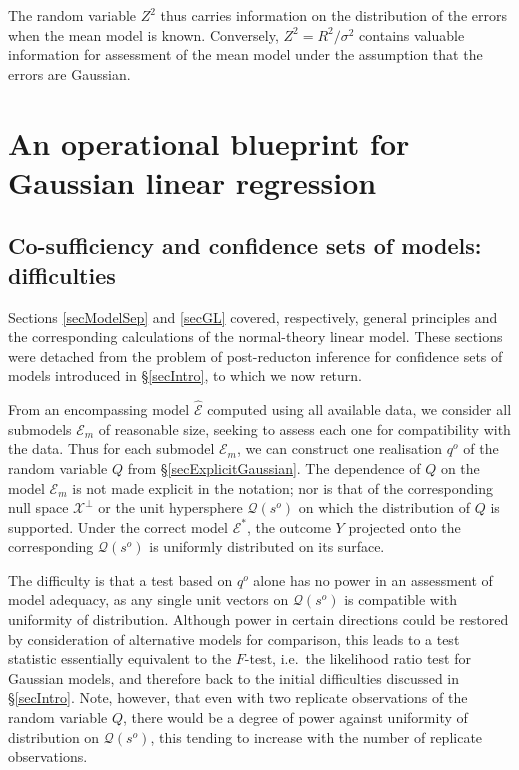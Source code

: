 \documentclass[10pt, reqno]{amsart}
\numberwithin{equation}{section}
\newcommand{\cosuff}{\mathcal{Q}}
\begin{document}
The random variable $Z^2$ thus carries information on the distribution of the errors when the mean model is known. Conversely, $Z^2=R^2/\sigma^2$ contains valuable information for assessment of the mean model under the assumption that the errors are Gaussian. 

\section{An operational blueprint for Gaussian linear regression}\label{secOperational}

\subsection{Co-sufficiency and confidence sets of models: difficulties}

Sections \ref{secModelSep} and \ref{secGL} covered, respectively, general principles and the corresponding calculations of the normal-theory linear model. These sections were detached from the problem of post-reducton inference for confidence sets of models introduced in \S \ref{secIntro}, to which we now return. 

From an encompassing model $\hat{\mathcal{E}}$ computed using all available data, we consider all submodels $\mathcal{E}_m$ of reasonable size, seeking to assess each one for compatibility with the data. Thus for each submodel $\mathcal{E}_m$, we can construct one realisation $q^o$ of the random variable $Q$ from \S \ref{secExplicitGaussian}. The dependence of $Q$ on the model $\mathcal{E}_m$ is not made explicit in the notation; nor is that of the corresponding null space $\mathcal{X}^\perp$ or the unit hypersphere $\mathcal{Q}(s^o)$ on which the distribution of $Q$ is supported. Under the correct model $\mathcal{E}^*$, the outcome $Y$ projected onto the corresponding $\mathcal{Q}(s^o)$ is uniformly distributed on its surface.  

The difficulty is that a test based on $q^o$ alone has no power in an assessment of model adequacy, as any single unit vectors on $\mathcal{Q}(s^o)$ is compatible with uniformity of distribution. Although power in certain directions could be restored by consideration of alternative models for comparison, this leads to a test statistic essentially equivalent to the $F$-test, i.e.~the likelihood ratio test for Gaussian models, and therefore back to the initial difficulties discussed in \S \ref{secIntro}. Note, however, that even with two replicate observations of the random variable $Q$, there would be a degree of power against uniformity of distribution on $\cosuff(s^o)$, this tending to increase with the number of replicate observations. 
\end{document}
